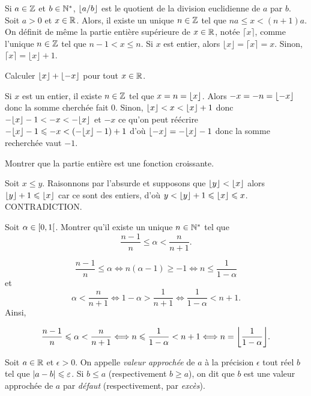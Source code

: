 \documentclass{magnolia}
\begin{document}
\begin{remarques}
  \remarque Si $a\in\mathbb{Z}$ et $b\in{\mathbb{N}^*}$, $\left\lfloor a/b\right\rfloor$ est le quotient de la division euclidienne de $a$ par $b$.
  \remarque Soit $a>0$ et $x\in\mathbb{R}$. Alors, il existe un unique $n\in\mathbb{Z}$
    tel que $na\leq x < (n+1)a$.
  \remarque  On définit de même la partie entière supérieure de $x\in\mathbb{R}$,
    notée $\lceil x\rceil$, comme l'unique $n\in\mathbb{Z}$ tel que $n-1<x\leq n$. Si $x$
    est entier, alors $\lfloor x\rfloor=\lceil x\rceil=x$. Sinon,
    $\lceil x\rceil=\lfloor x\rfloor+1$.
\end{remarques}

\begin{exos}
\exo Calculer $\left\lfloor x\right\rfloor+\left\lfloor-x\right\rfloor$ pour tout $x\in\mathbb{R}$.
\begin{sol}
Si $x$ est un entier, il existe $n\in \mathbb{Z}$ tel que $x=n=\left\lfloor x\right\rfloor$. Alors $-x=-n=\left\lfloor-x\right\rfloor$ donc la somme cherchée fait $0$.
Sinon, $\left\lfloor x\right\rfloor<x<\left\lfloor x\right\rfloor+1$ donc $-\ent{x}-1<-x<-\ent{x}$ et $-x$ ce qu'on peut réécrire $-\ent{x}-1\leq -x<\p{-\ent{x}-1}+1$ d'où $\ent{-x}=-\ent{x}-1$ donc la somme recherchée vaut $-1$.
\end{sol}
\exo Montrer que la partie entière est une fonction croissante.
\begin{sol}
Soit $x\leq y$. Raisonnons par l'absurde et supposons que $\left\lfloor y\right\rfloor<\left\lfloor x\right\rfloor$ alors $\left\lfloor y\right\rfloor+1\leqslant \left\lfloor x\right\rfloor$ car ce sont des entiers, d'où $y<\left\lfloor y\right\rfloor+1\leqslant \left\lfloor x\right\rfloor\leqslant x$. CONTRADICTION.
\end{sol}
\exo Soit $\alpha\in\left[0,1\right[$. Montrer qu'il existe un unique
  $n\in{\mathbb{N}^*}$ tel que
  \[\frac{n-1}{n}\leq \alpha<\frac{n}{n+1}.\]
  \begin{sol}
$$\frac{n-1}{n}\leq \alpha \Longleftrightarrow n(\alpha-1)\geq -1 \Longleftrightarrow n\leq \frac{1}{1-\alpha} $$
et $$\alpha<\frac{n}{n+1} \Longleftrightarrow 1-\alpha > \frac{1}{n+1} \Longleftrightarrow \frac{1}{1-\alpha}<n+1.$$
Ainsi,

$$\frac{n-1}{n}\leq \alpha<\frac{n}{n+1} \Longleftrightarrow n\leq \frac{1}{1-\alpha}<n+1\Longleftrightarrow n=\ent{\frac{1}{1-\alpha}}.$$
  \end{sol}
\end{exos}



\begin{definition}[utile=-3]
Soit $a\in\mathbb{R}$ et $\epsilon>0$. On appelle \emph{valeur approchée} de $a$ à la précision
$\epsilon$ tout réel $b$ tel que $\left|a-b\right|\leqslant\varepsilon$.
Si $b\leq a$ (respectivement $b\geq a$), on dit que $b$ est une valeur approchée
de $a$ par \emph{défaut} (respectivement, par \emph{excès}).
\end{definition}
\end{document}
